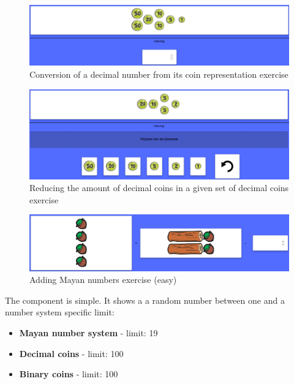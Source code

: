 \begin{figure} 
  \centering
  \includegraphics[width=1.0 \columnwidth]{figures/coins_from.png}
  \caption{Conversion of a decimal number from its coin representation exercise} 
  \label{fig:coinsFrom} 
\end{figure}

\begin{figure} 
  \centering
  \includegraphics[width=1.0 \columnwidth]{figures/coins_swap.png}
  \caption{Reducing the amount of decimal coins in a given set of decimal coins exercise} 
  \label{fig:coinsSwap} 
\end{figure}

\begin{figure} 
  \centering
  \includegraphics[width=1.0 \columnwidth]{figures/mayas_addition.png}
  \caption{Adding Mayan numbers exercise (easy)} 
  \label{fig:mayanAddition} 
\end{figure}

The  component is simple. It shows a a random number between one and a number system specific limit:

\begin{itemize}
  \item \textbf{Mayan number system} - limit: 19
  \item \textbf{Decimal coins} - limit: 100
  \item \textbf{Binary coins} - limit: 100
\end{itemize}

